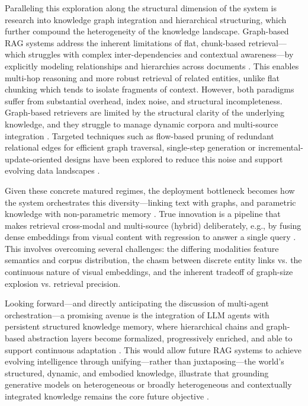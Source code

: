 \documentclass[11pt,a4paper]{article}
\begin{document}
Paralleling this exploration along the structural dimension of the system is research into knowledge graph integration and hierarchical structuring, which further compound the heterogeneity of the knowledge landscape. Graph-based RAG systems address the inherent limitations of flat, chunk-based retrieval---which struggles with complex inter-dependencies and contextual awareness---by explicitly modeling relationships and hierarchies across documents \cite{arxiv:2510.02657v3}. This enables multi-hop reasoning and more robust retrieval of related entities, unlike flat chunking which tends to isolate fragments of context. However, both paradigms suffer from substantial overhead, index noise, and structural incompleteness. Graph-based retrievers are limited by the structural clarity of the underlying knowledge, and they struggle to manage dynamic corpora and multi-source integration \cite{arxiv:2503.04338v2,arxiv:2502.11371v3}. Targeted techniques such as flow-based pruning of redundant relational edges for efficient graph traversal, single-step generation or incremental-update-oriented designs have been explored to reduce this noise and support evolving data landscapes \cite{arxiv:2502.11371v3,arxiv:2208.07652v1,arxiv:2502.11371v3}.

Given these concrete matured regimes, the deployment bottleneck becomes how the system orchestrates this diversity---linking text with graphs, and parametric knowledge with non-parametric memory \cite{arxiv:2605.15156v2,arxiv:2401.14887v3}. True innovation is a pipeline that makes retrieval cross-modal and multi-source (hybrid) deliberately, e.g., by fusing dense embeddings from visual content with regression to answer a single query \cite{arxiv:2502.00592v2}. This involves overcoming several challenges: the differing modalities feature semantics and corpus distribution, the chasm between discrete entity links vs. the continuous nature of visual embeddings, and the inherent tradeoff of graph-size explosion vs. retrieval precision.

Looking forward---and directly anticipating the discussion of multi-agent orchestration---a promising avenue is the integration of LLM agents with persistent structured knowledge memory, where hierarchical chains and graph-based abstraction layers become formalized, progressively enriched, and able to support continuous adaptation \cite{arxiv:2412.05838v1}. This would allow future RAG systems to achieve evolving intelligence through unifying---rather than juxtaposing---the world's structured, dynamic, and embodied knowledge, illustrate that grounding generative models on heterogeneous or broadly heterogeneous and contextually integrated knowledge remains the core future objective \cite{arxiv:2605.15156v2}.
\end{document}
